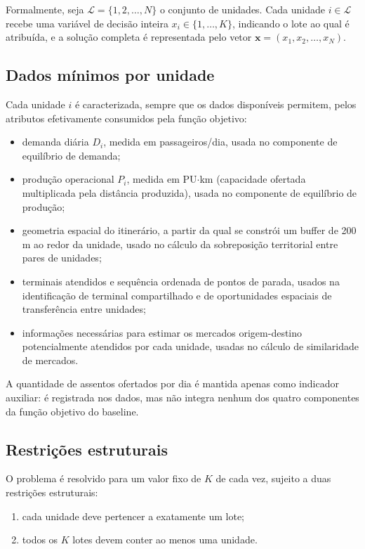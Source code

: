\documentclass[12pt,a4paper]{article}
\begin{document}
Formalmente, seja \(\mathcal{L}=\{1,2,\ldots,N\}\) o conjunto de unidades.
Cada unidade \(i\in\mathcal{L}\) recebe uma variável de decisão inteira
\(x_i\in\{1,\ldots,K\}\), indicando o lote ao qual é atribuída, e a
solução completa é representada pelo vetor
\(\mathbf{x}=(x_1,x_2,\ldots,x_N)\).

\subsection{Dados mínimos por unidade}

Cada unidade \(i\) é caracterizada, sempre que os dados disponíveis
permitem, pelos atributos efetivamente consumidos pela função objetivo:

\begin{itemize}
  \item demanda diária \(D_i\), medida em passageiros/dia, usada no
    componente de equilíbrio de demanda;
  \item produção operacional \(P_i\), medida em
    PU$\cdot$km (capacidade ofertada multiplicada pela distância
    produzida), usada no componente de equilíbrio de produção;
  \item geometria espacial do itinerário, a partir da qual se constrói um
    buffer de 200 m ao redor da unidade, usado no cálculo da sobreposição
    territorial entre pares de unidades;
  \item terminais atendidos e sequência ordenada de pontos de parada,
    usados na identificação de terminal compartilhado e de oportunidades
    espaciais de transferência entre unidades;
  \item informações necessárias para estimar os mercados
    origem-destino potencialmente atendidos por cada unidade, usadas no
    cálculo de similaridade de mercados.
\end{itemize}

A quantidade de assentos ofertados por dia é mantida apenas como
indicador auxiliar: é registrada nos dados, mas não integra nenhum dos
quatro componentes da função objetivo do baseline.

\subsection{Restrições estruturais}

O problema é resolvido para um valor fixo de \(K\) de cada vez, sujeito a
duas restrições estruturais:

\begin{enumerate}
  \item cada unidade deve pertencer a exatamente um lote;
  \item todos os \(K\) lotes devem conter ao menos uma unidade.
\end{enumerate}
\end{document}
